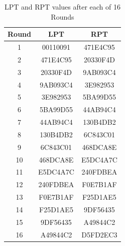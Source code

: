 \documentclass[12pt, letterpaper]{article}
\begin{document}
\begin{table}[ht]
  \centering
  
  \label{tab:sample-table}
    \begin{tabular}{|c|c|c|}
    
      \hline
    Round & LPT & RPT  \\
    \hline
    1 & 00110091 & 471E4C95  \\
        \hline
    2 & 471E4C95 & 20330F4D

  \\
         \hline
    3 & 20330F4D & 9AB093C4  \\
         \hline
    4 & 9AB093C4 & 3E982953   \\
         \hline
    5 & 3E982953 & 5BA99D55  \\
        \hline
    6 & 5BA99D55 & 44AB94C4   \\
         \hline
    7 &  44AB94C4 & 130B4DB2

  \\
         \hline
    8 & 130B4DB2 & 6C843C01

 

  \\
         \hline
    9 & 6C843C01

 & 468DCA8E

  \\
         \hline
    10 & 468DCA8E

 & E5DC4A7C

  \\
         \hline
    11 & E5DC4A7C

 & 240FDBEA

  \\
         \hline
    12 & 240FDBEA

 & F0E7B1AF

  \\
         \hline
    13 & F0E7B1AF

 & F25D1AE5 \\
         \hline
    14 & F25D1AE5 & 9DF56435

  \\
         \hline
    15 & 9DF56435

 & A49844C2

  \\
         \hline
    16 & A49844C2

 & D5FD2EC3

  \\
    \hline
  \end{tabular}
    \caption{LPT and RPT values after each of 16 Rounds}

    

\end{table}
\end{document}
